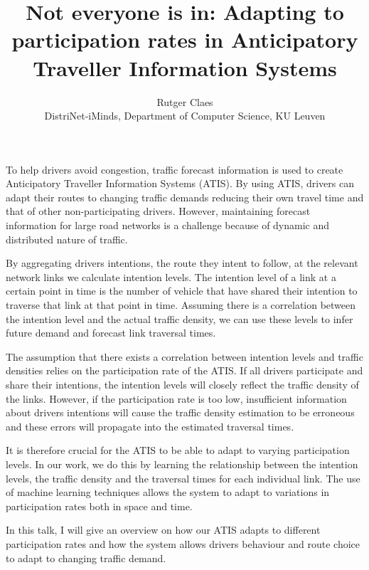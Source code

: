 \documentclass[12pt,a4paper]{article}
\title{\Large Not everyone is in: Adapting to participation rates in Anticipatory Traveller Information Systems}
\author{\normalsize Rutger Claes\\\normalsize DistriNet-iMinds, Department of Computer Science, KU Leuven}
\date{}
\begin{document}
\maketitle
\thispagestyle{empty}

To help drivers avoid congestion, traffic forecast information is used to create Anticipatory Traveller Information Systems (ATIS). By using ATIS, drivers can adapt their routes to changing traffic demands reducing their own travel time and that of other non-participating drivers. However, maintaining forecast information for large road networks is a challenge because of dynamic and distributed nature of traffic.

By aggregating drivers intentions, the route they intent to follow, at the relevant network links we calculate intention levels. The intention level of a link at a certain point in time is the number of vehicle that have shared their intention to traverse that link at that point in time. Assuming there is a correlation between the intention level and the actual traffic density, we can use these levels to infer future demand and forecast link traversal times.

The assumption that there exists a correlation between intention levels and traffic densities relies on the participation rate of the ATIS. If all drivers participate and share their intentions, the intention levels will closely reflect the traffic density of the links. However, if the participation rate is too low, insufficient information about drivers intentions will cause the traffic density estimation to be erroneous and these errors will propagate into the estimated traversal times.

It is therefore crucial for the ATIS to be able to adapt to varying participation levels. In our work, we do this by learning the relationship between the intention levels, the traffic density and the traversal times for each individual link. The use of machine learning techniques allows the system to adapt to variations in participation rates both in space and time.

In this talk, I will give an overview on how our ATIS adapts to different participation rates and how the system allows drivers behaviour and route choice to adapt to changing traffic demand.
\end{document}
